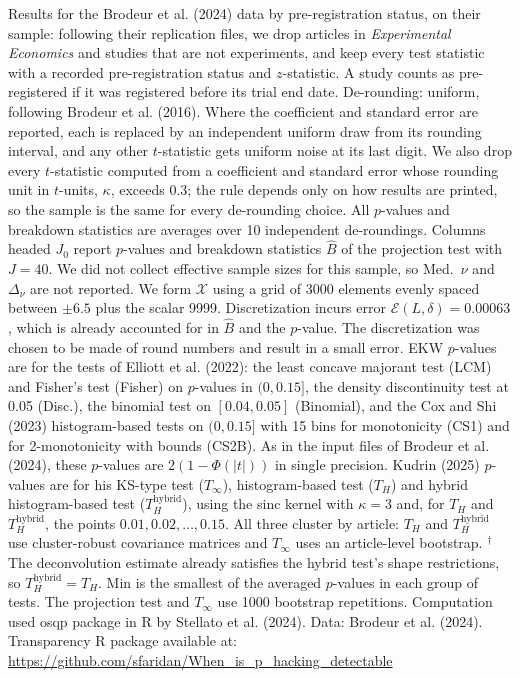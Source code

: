 \begin{table}[htbp]
\medskip
\begin{minipage}{\linewidth}
Results for the Brodeur et al. (2024) data by pre-registration status, on their sample: following their replication files, we drop articles in \textit{Experimental Economics} and studies that are not experiments, and keep every test statistic with a recorded pre-registration status and $z$-statistic.
A study counts as pre-registered if it was registered before its trial end date.
De-rounding: uniform, following Brodeur et al. (2016). Where the coefficient and standard error are reported, each is replaced by an independent uniform draw from its rounding interval, and any other $t$-statistic gets uniform noise at its last digit.
We also drop every $t$-statistic computed from a coefficient and standard error whose rounding unit in $t$-units, $\kappa$, exceeds 0.3; the rule depends only on how results are printed, so the sample is the same for every de-rounding choice.
All $p$-values and breakdown statistics are averages over 10 independent de-roundings.
Columns headed $J_0$ report $p$-values and breakdown statistics $\widehat{B}$ of the projection test with $J=40$.
We did not collect effective sample sizes for this sample, so Med.\ $\nu$ and $\Delta_\nu$ are not reported.
We form $\mathcal{X}$ using a grid of 3000 elements evenly spaced between $\pm 6.5$ plus the scalar 9999.
Discretization incurs error $\mathcal{E}(L,\delta)=0.00063$, which is already accounted for in $\widehat{B}$ and the $p$-value.
The discretization was chosen to be made of round numbers and result in a small error.
EKW $p$-values are for the tests of Elliott et al. (2022): the least concave majorant test (LCM) and Fisher's test (Fisher) on $p$-values in $(0,0.15]$, the density discontinuity test at 0.05 (Disc.), the binomial test on $[0.04,0.05]$ (Binomial), and the Cox and Shi (2023) histogram-based tests on $(0,0.15]$ with 15 bins for monotonicity (CS1) and for 2-monotonicity with bounds (CS2B).
As in the input files of Brodeur et al. (2024), these $p$-values are $2(1-\Phi(|t|))$ in single precision.
Kudrin (2025) $p$-values are for his KS-type test ($T_\infty$), histogram-based test ($T_H$) and hybrid histogram-based test ($T_H^{\mathrm{hybrid}}$), using the sinc kernel with $\kappa=3$ and, for $T_H$ and $T_H^{\mathrm{hybrid}}$, the points $0.01,0.02,\ldots,0.15$.
All three cluster by article: $T_H$ and $T_H^{\mathrm{hybrid}}$ use cluster-robust covariance matrices and $T_\infty$ uses an article-level bootstrap.
$^\dagger$The deconvolution estimate already satisfies the hybrid test's shape restrictions, so $T_H^{\mathrm{hybrid}}=T_H$.
Min is the smallest of the averaged $p$-values in each group of tests.
The projection test and $T_\infty$ use 1000 bootstrap repetitions.
Computation used osqp package in R by Stellato et al. (2024). Data: Brodeur et al. (2024).
Transparency R package available at: \url{https://github.com/sfaridan/When_is_p_hacking_detectable}
\end{minipage}
\end{table}
